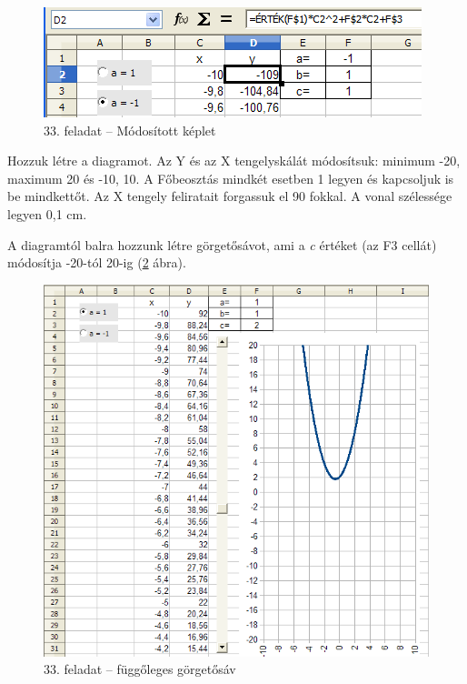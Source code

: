\begin{figure}[!h]
\begin{center}
\includegraphics[width=11.005cm]{oocalcv2-img154.png}
\caption{33. feladat -- Módosított képlet}\label{33-feladatMódosított}
\end{center}
\end{figure}

Hozzuk létre a diagramot. Az Y és az X tengelyskálát
módosítsuk: minimum -20, maximum 20 és -10, 10. A
Főbeosztás mindkét esetben 1 legyen és kapcsoljuk is be
mindkettőt. Az X tengely feliratait forgassuk el 90 fokkal. A vonal
szélessége legyen 0,1 cm. 

A diagramtól balra hozzunk létre görgetősávot, ami a
\textit{c} értéket (az F3 cellát) módosítja -20-tól 20-ig
(\ref{33-feladatGörgetősáv} ábra).

\begin{figure}[!h]
\begin{center}
\includegraphics[width=14.9cm]{oocalcv2-img155.png}
\caption{33. feladat -- függőleges görgetősáv} \label{33-feladatGörgetősáv}
\end{center}
\end{figure}

